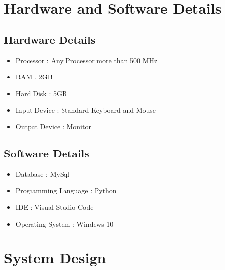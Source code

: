 \documentclass[12pt,a4paper]{report}
\begin{document}
\chapter{Hardware and Software Details}
\section{Hardware Details}
\begin{itemize}
\item Processor : Any Processor more than 500 MHz
\item RAM : 2GB
\item Hard Disk : 5GB
\item Input Device : Standard Keyboard and Mouse
\item Output Device : Monitor
\end{itemize}
\section{Software Details}
\begin{itemize}
\item Database : MySql
\item Programming Language : Python
\item IDE : Visual Studio Code
\item Operating System : Windows 10
\end{itemize}

\chapter{System Design}
\end{document}
